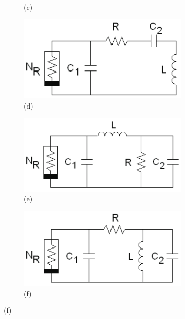 \documentclass[12pt]{article}
\begin{document}
\begin{figure}[H]
\begin{subfigure}[b]{0.5\textwidth}
		\caption{(c)}
		\label{fig:1c}
	\end{subfigure}%
	\begin{subfigure}[b]{0.5\textwidth}
		\centering
		\includegraphics[width=0.9\textwidth]{Images/fig1(d).png}
		\caption{(d)}
		\label{fig:1d}
	\end{subfigure}
	\begin{subfigure}[b]{0.5\textwidth}
		\centering
		\includegraphics[width=0.9\textwidth]{Images/fig1(e).png}
		\caption{(e)}
		\label{fig:1e}
	\end{subfigure}%
	\begin{subfigure}[b]{0.5\textwidth}
		\centering
		\includegraphics[width=0.9\textwidth]{Images/fig1(f).png}
		\caption{(f)}
		\label{fig:1f}
	\end{subfigure}
\end{figure}
\end{document}
